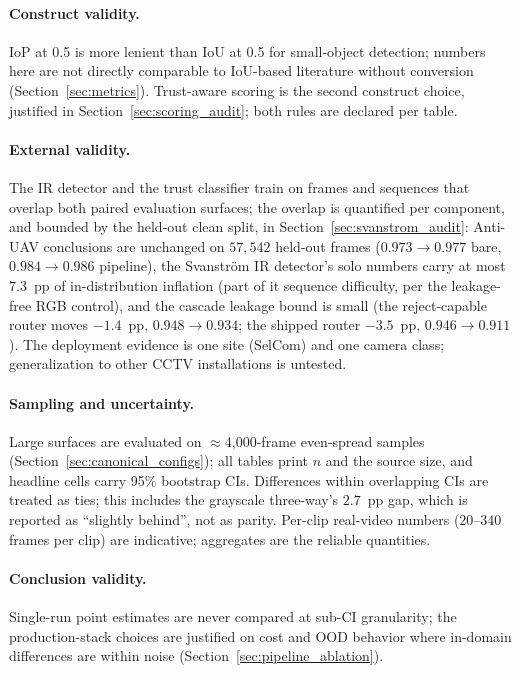 \paragraph{Construct validity.}
IoP at 0.5 is more lenient than IoU at 0.5 for small-object detection; numbers here are not directly comparable to IoU-based literature without conversion (Section~\ref{sec:metrics}). Trust-aware scoring is the second construct choice, justified in Section~\ref{sec:scoring_audit}; both rules are declared per table.

\paragraph{External validity.}
The IR detector and the trust classifier train on frames and sequences that overlap both paired evaluation surfaces; the overlap is quantified per component, and bounded by the held-out clean split, in Section~\ref{sec:svanstrom_audit}: Anti-UAV conclusions are unchanged on $57{,}542$ held-out frames ($0.973 \to 0.977$ bare, $0.984 \to 0.986$ pipeline), the Svanstr\"om IR detector's solo numbers carry at most $7.3$~pp of in-distribution inflation (part of it sequence difficulty, per the leakage-free RGB control), and the cascade leakage bound is small (the reject-capable router moves $-1.4$~pp, $0.948 \to 0.934$; the shipped router $-3.5$~pp, $0.946 \to 0.911$). The deployment evidence is one site (SelCom) and one camera class; generalization to other CCTV installations is untested.

\paragraph{Sampling and uncertainty.}
Large surfaces are evaluated on $\approx$4{,}000-frame even-spread samples (Section~\ref{sec:canonical_configs}); all tables print $n$ and the source size, and headline cells carry 95\% bootstrap CIs. Differences within overlapping CIs are treated as ties; this includes the grayscale three-way's $2.7$~pp gap, which is reported as ``slightly behind'', not as parity. Per-clip real-video numbers ($20$--$340$ frames per clip) are indicative; aggregates are the reliable quantities.

\paragraph{Conclusion validity.}
Single-run point estimates are never compared at sub-CI granularity; the production-stack choices are justified on cost and OOD behavior where in-domain differences are within noise (Section~\ref{sec:pipeline_ablation}).

